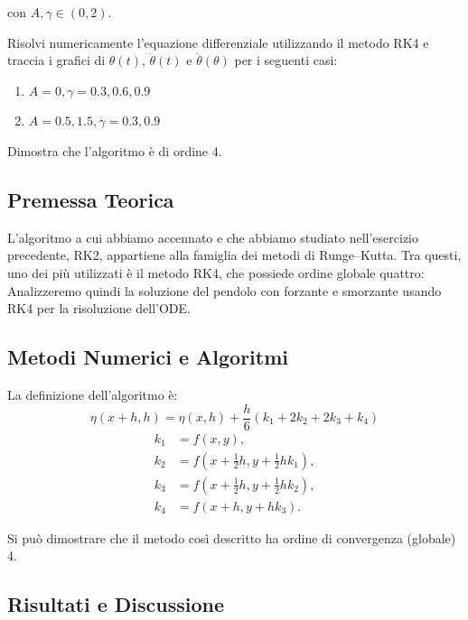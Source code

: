 con $A, \gamma \in (0, 2)$.

\noindent Risolvi numericamente l'equazione differenziale utilizzando il metodo RK4 e traccia i grafici di $\theta(t)$, $\dot{\theta}(t)$ e $\dot{\theta}(\theta)$ per i seguenti casi:

\begin{enumerate}
    \item $A = 0, \gamma = 0.3, 0.6, 0.9$
    \item $A = 0.5, 1.5, \gamma = 0.3, 0.9$
\end{enumerate}

\noindent Dimostra che l'algoritmo è di ordine 4.

\subsection{Premessa Teorica}
L'algoritmo a cui abbiamo accennato e che abbiamo studiato nell'esercizio precedente, RK2, appartiene alla famiglia dei metodi di Runge–Kutta. Tra questi, uno dei più utilizzati è il metodo RK4, che possiede ordine globale quattro: Analizzeremo quindi la soluzione del pendolo con forzante e smorzante usando RK4 per la risoluzione dell'ODE.


\subsection{Metodi Numerici e Algoritmi}

La definizione dell'algoritmo è:
\[
\eta(x+ h,h) = \eta(x,h) + \frac{h}{6} \left( k_1 + 2k_2 + 2k_3 + k_4 \right)
\]
\begin{align*}
    k_1 &= f(x, y) , \\
    k_2 &= f(x + \frac{1}{2}h, y + \frac{1}{2}hk_1) , \\
    k_3 &= f(x + \frac{1}{2}h, y + \frac{1}{2}hk_2) , \\
    k_4 &= f(x + h, y + hk_3) .
\end{align*}

\bigskip\noindent
Si può dimostrare che il metodo così descritto ha ordine di convergenza (globale) 4.

\subsection{Risultati e Discussione}


